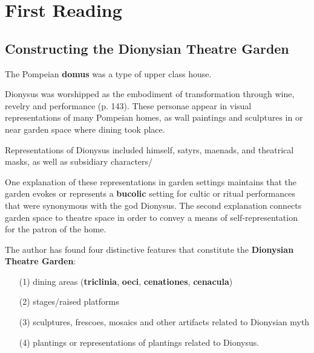 \section{First Reading}
\label{sec:FirRead15}


\subsection{Constructing the Dionysian Theatre Garden}

\begin{defn}
    The Pompeian \textbf{domus} was a type of upper class house.
\end{defn}

\begin{rmk}
    Dionysus was worshipped as the embodiment of transformation through wine, revelry and performance (p. 143). These personae appear in visual representations of many Pompeian homes, as wall paintings and sculptures in or near garden space where dining took place.
\end{rmk}

\begin{nte}
    Representations of Dionysus included himself, satyrs, maenads, and theatrical masks, as well as subsidiary characters/
\end{nte}

One explanation of these representations in garden settings maintains that the garden evokes or represents a \textbf{bucolic} setting for cultic or ritual performances that were synonymous with the god Dionysus. The second explanation connects garden space to theatre space in order to convey a means of self-representation for the patron of the home.

\begin{defn}
    The author has found four distinctive features that constitute the \textbf{Dionysian Theatre Garden}: \begin{itemize}
        \item[(1)] dining areas (\textbf{triclinia}, \textbf{oeci}, \textbf{cenationes}, \textbf{cenacula})
        \item[(2)] stages/raised platforms
        \item[(3)] sculptures, frescoes, mosaics and other artifacts related to Dionysian myth
        \item[(4)] plantings or representations of plantings related to Dionysus.
    \end{itemize}
\end{defn}

